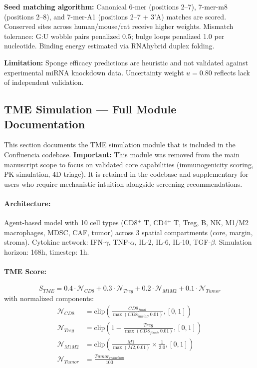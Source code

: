 \textbf{Seed matching algorithm:} Canonical 6-mer (positions 2--7), 7-mer-m8 (positions 2--8), and 7-mer-A1 (positions 2--7 + 3'A) matches are scored. Conserved sites across human/mouse/rat receive higher weights. Mismatch tolerance: G:U wobble pairs penalized 0.5; bulge loops penalized 1.0 per nucleotide. Binding energy estimated via RNAhybrid duplex folding.

\textbf{Limitation:} Sponge efficacy predictions are heuristic and not validated against experimental miRNA knockdown data. Uncertainty weight $u{=}0.80$ reflects lack of independent validation.

\subsection*{TME Simulation — Full Module Documentation}

This section documents the TME simulation module that is included in the Confluencia codebase. \textbf{Important:} This module was removed from the main manuscript scope to focus on validated core capabilities (immunogenicity scoring, PK simulation, 4D triage). It is retained in the codebase and supplementary for users who require mechanistic intuition alongside screening recommendations.

\paragraph{Architecture:} Agent-based model with 10 cell types (CD8$^+$ T, CD4$^+$ T, Treg, B, NK, M1/M2 macrophages, MDSC, CAF, tumor) across 3 spatial compartments (core, margin, stroma). Cytokine network: IFN-$\gamma$, TNF-$\alpha$, IL-2, IL-6, IL-10, TGF-$\beta$. Simulation horizon: 168h, timestep: 1h.

\paragraph{TME Score:}
\begin{equation}
S_{TME} = 0.4 \cdot \mathcal{N}_{CD8} + 0.3 \cdot \mathcal{N}_{Treg} + 0.2 \cdot \mathcal{N}_{M1M2} + 0.1 \cdot \mathcal{N}_{Tumor}
\end{equation}
with normalized components:
\begin{align}
\mathcal{N}_{CD8} &= \text{clip}\left(\frac{CD8_{final}}{\max(CD8_{initial}, 0.01)}, [0, 1]\right) \\
\mathcal{N}_{Treg} &= \text{clip}\left(1 - \frac{Treg}{\max(CD8_{final}, 0.01)}, [0, 1]\right) \\
\mathcal{N}_{M1M2} &= \text{clip}\left(\frac{M1}{\max(M2, 0.01)} \times \frac{1}{2.0}, [0, 1]\right) \\
\mathcal{N}_{Tumor} &= \frac{Tumor_{reduction}}{100}
\end{align}

